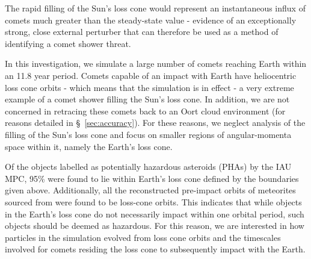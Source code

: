 The rapid filling of the Sun's loss cone would represent an instantaneous influx of comets much greater than the steady-state value - evidence of an exceptionally strong, close external perturber that can therefore be used as a method of identifying a comet shower threat.

In this investigation, we simulate a large number of comets reaching Earth within an 11.8 year period. Comets capable of an impact with Earth have heliocentric loss cone orbits - which means that the simulation is in effect - a very extreme example of a comet shower filling the Sun's loss cone. In addition, we are not concerned in retracing these comets back to an Oort cloud environment (for reasons detailed in \S~\ref{sec:accuracy}). For these reasons, we neglect analysis of the filling of the Sun's loss cone and focus on smaller regions of angular-momenta space within it, namely the Earth's loss cone.


%

Of the objects labelled as potentially hazardous asteroids (PHAs) by the IAU MPC, 95\% were found to lie within Earth's loss cone defined by the boundaries given above. Additionally, all the reconstructed pre-impact orbits of meteorites sourced from \cite{doi:10.1093/mnras/stv378} were found to be loss-cone orbits. This indicates that while objects in the Earth's loss cone do not necessarily impact within one orbital period, such objects should be deemed as hazardous. For this reason, we are interested in how particles in the simulation evolved from loss cone orbits and the timescales involved for comets residing the loss cone to subsequently impact with the Earth.

